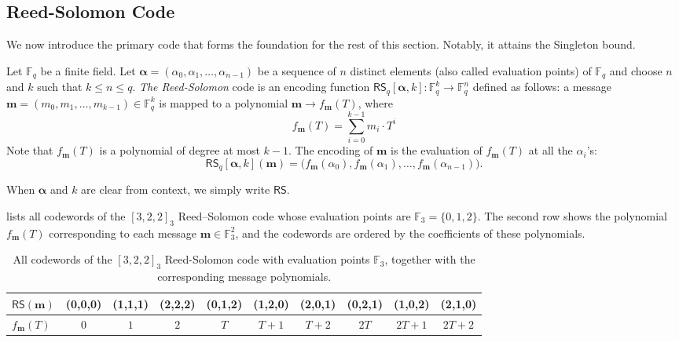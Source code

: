 \documentclass[../../book]{subfiles}
\begin{document}
\subsection{Reed-Solomon Code}
We now introduce the primary code that forms the foundation for the rest of this section. Notably, it attains the Singleton bound.
\begin{definition}\label{def:rs}
  Let $\mathbb{F}_q$ be a finite field. Let $\bm{\alpha} = (\alpha_0, \alpha_1, \ldots, \alpha_{n-1})$ be a sequence of $n$ distinct elements (also called evaluation points) of $\mathbb{F}_q$ and choose $n$ and $k$ such that $k\leq n \leq q$. \emph{The Reed-Solomon} code is an encoding function $\mathsf{RS}_q[\bm{\alpha},k]: \mathbb{F}_q^k \to \mathbb{F}_q^n$ defined as follows: a message $\mathbf{m} = (m_0, m_1, \ldots, m_{k-1}) \in \mathbb{F}_q^k$ is mapped to a polynomial $\mathbf{m}\rightarrow f_{\mathbf{m}}(T)$, where
  \begin{equation*}
    f_{\mathbf{m}}(T) = \sum_{i=0}^{k-1} m_i\cdot T^i
  \end{equation*}
  Note that $f_{\mathbf{m}}(T)$ is a polynomial of degree at most $k-1$. The encoding of $\mathbf{m}$ is the evaluation of $f_{\mathbf{m}}(T)$ at all the $\alpha_i$'s:
\begin{equation*}
    \mathsf{RS}_q[\bm{\alpha},k](\mathbf{m}) = \big(f_{\mathbf{m}}(\alpha_0), f_{\mathbf{m}}(\alpha_1), \ldots, f_{\mathbf{m}}(\alpha_{n-1})\big).
\end{equation*}
\end{definition}

When $\bm{\alpha}$ and $k$ are clear from context, we simply write $\mathsf{RS}$.

 lists all codewords of the $[3,2,2]_3$ Reed--Solomon code whose evaluation points are $\mathbb{F}_3 = \{0,1,2\}$. The second row shows the polynomial $f_{\mathbf{m}}(T)$ corresponding to each message $\mathbf{m} \in \mathbb{F}_3^2$, and the codewords are ordered by the coefficients of these polynomials.

\begin{table}[h!]
\centering
\scriptsize
\begin{tabular}{|l|c|c|c|c|c|c|c|c|c|}
\hline
$\mathsf{RS}(\mathbf{m})$ & (0,0,0) & (1,1,1) & (2,2,2) & (0,1,2) & (1,2,0) & (2,0,1) & (0,2,1) & (1,0,2) & (2,1,0) \\ \hline
$f_{\mathbf{m}}(T)$       & $0$ & $1$ & $2$ & $T$ & $T+1$ & $T+2$ & $2T$ & $2T+1$ & $2T+2$ \\ \hline
\end{tabular}
\caption{All codewords of the $[3,2,2]_3$ Reed-Solomon code with evaluation points $\mathbb{F}_3$, together with the corresponding message polynomials.}
\label{tab:rs-example}
\end{table}
\end{document}
